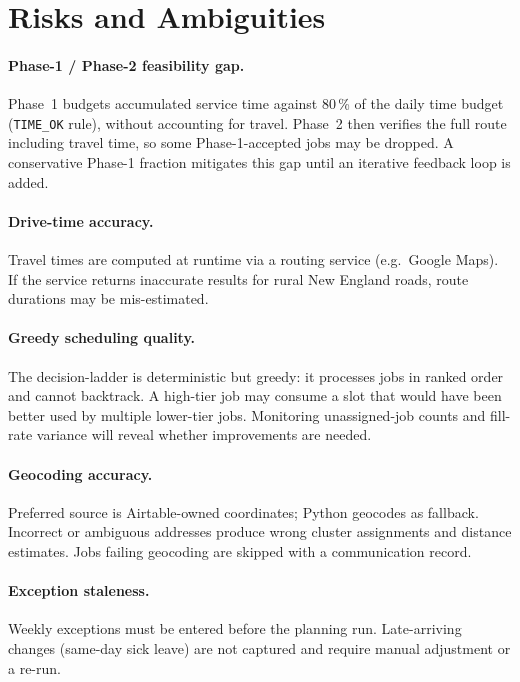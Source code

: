 \documentclass[12pt]{article}
\begin{document}
\section*{Risks and Ambiguities}

\paragraph{Phase-1 / Phase-2 feasibility gap.}
Phase~1 budgets accumulated service time against 80\,\% of the daily time budget (\texttt{TIME\_OK} rule), without accounting for travel.  Phase~2 then verifies the full route including travel time, so some Phase-1-accepted jobs may be dropped.
A conservative Phase-1 fraction mitigates this gap until an iterative feedback loop is added.

\paragraph{Drive-time accuracy.}
Travel times are computed at runtime via a routing service (e.g.\ Google Maps).
If the service returns inaccurate results for rural New England roads, route durations may be mis-estimated.

\paragraph{Greedy scheduling quality.}
The decision-ladder is deterministic but greedy: it processes jobs in ranked order and cannot backtrack.
A high-tier job may consume a slot that would have been better used by multiple lower-tier jobs.
Monitoring unassigned-job counts and fill-rate variance will reveal whether improvements are needed.

\paragraph{Geocoding accuracy.}
Preferred source is Airtable-owned coordinates; Python geocodes as fallback.
Incorrect or ambiguous addresses produce wrong cluster assignments and distance estimates.
Jobs failing geocoding are skipped with a communication record.

\paragraph{Exception staleness.}
Weekly exceptions must be entered before the planning run.
Late-arriving changes (same-day sick leave) are not captured and require manual adjustment or a re-run.
\end{document}
